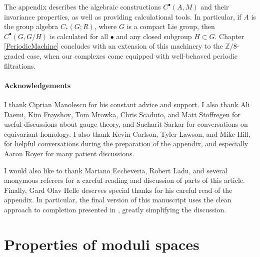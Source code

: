 \documentclass{memo-l}
\theoremstyle{definition}
\theoremstyle{remark}
\numberwithin{section}{chapter}
\numberwithin{equation}{chapter}
\begin{document}
The appendix describes the algebraic constructions $C^\bullet(A,M)$ and their invariance properties, as well as providing calculational tools. In particular, if $A$ is the group algebra $C_*(G;R)$, where $G$ is a compact Lie group, then $C^\bullet(G, G/H)$ is calculated for all $\bullet$ and any closed subgroup $H \subset G$. Chapter \ref{PeriodicMachine} concludes with an extension of this machinery to the $\mathbb Z/8$-graded case, when our complexes come equipped with well-behaved periodic filtrations.
%
%
%
\subsection*{Acknowledgements}I thank Ciprian Manolescu for his constant advice and support. I also thank Ali Daemi, Kim Fr\o yshov, Tom Mrowka, Chris Scaduto, and Matt Stoffregen for useful discussions about gauge theory, and Sucharit Sarkar for conversations on equivariant homology. I also thank Kevin Carlson, Tyler Lawson, and Mike Hill, for helpful conversations during the preparation of the appendix, and especially Aaron Royer for many patient discussions. 

I would also like to thank Mariano Eccheveria, Robert Ladu, and several anonymous referees for a careful reading and discussion of parts of this article. Finally, Gard Olav Helle deserves special thanks for his careful read of the appendix. In particular, the final version of this manuscript uses the clean approach to completion presented in \cite{GOH}, greatly simplifying the discussion. 


\mainmatter

\part{Properties of moduli spaces}\label{part1}

\end{document}
